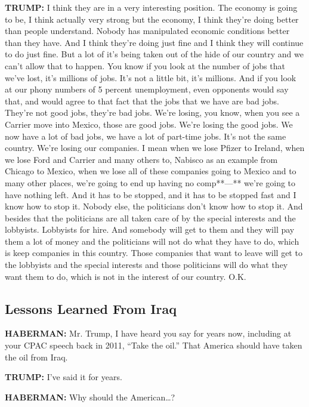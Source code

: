 \textbf{TRUMP:} I think they are in a very interesting position. The
economy is going to be, I think actually very strong but the economy, I
think they're doing better than people understand. Nobody has
manipulated economic conditions better than they have. And I think
they're doing just fine and I think they will continue to do just fine.
But a lot of it's being taken out of the hide of our country and we
can't allow that to happen. You know if you look at the number of jobs
that we've lost, it's millions of jobs. It's not a little bit, it's
millions. And if you look at our phony numbers of 5 percent
unemployment, even opponents would say that, and would agree to that
fact that the jobs that we have are bad jobs. They're not good jobs,
they're bad jobs. We're losing, you know, when you see a Carrier move
into Mexico, those are good jobs. We're losing the good jobs. We now
have a lot of bad jobs, we have a lot of part-time jobs. It's not the
same country. We're losing our companies. I mean when we lose Pfizer to
Ireland, when we lose Ford and Carrier and many others to, Nabisco as an
example from Chicago to Mexico, when we lose all of these companies
going to Mexico and to many other places, we're going to end up having
no comp**---** we're going to have nothing left. And it has to be
stopped, and it has to be stopped fast and I know how to stop it. Nobody
else, the politicians don't know how to stop it. And besides that the
politicians are all taken care of by the special interests and the
lobbyists. Lobbyists for hire. And somebody will get to them and they
will pay them a lot of money and the politicians will not do what they
have to do, which is keep companies in this country. Those companies
that want to leave will get to the lobbyists and the special interests
and those politicians will do what they want them to do, which is not in
the interest of our country. O.K.

\hypertarget{lessons-learned-from-iraq}{%
\subsection{Lessons Learned From Iraq}\label{lessons-learned-from-iraq}}

\textbf{HABERMAN:} Mr. Trump, I have heard you say for years now,
including at your CPAC speech back in 2011, ``Take the oil.'' That
America should have taken the oil from Iraq.

\textbf{TRUMP:} I've said it for years.

\textbf{HABERMAN:} Why should the American\ldots{}?

